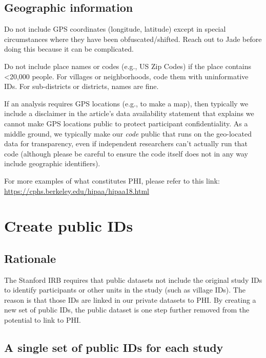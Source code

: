 \documentclass[
]{book}
\begin{document}
\subsection{Geographic information}\label{geographic-information}

Do not include GPS coordinates (longitude, latitude) except in special circumstances where they have been obfuscated/shifted. Reach out to Jade before doing this because it can be complicated.

Do not include place names or codes (e.g., US Zip Codes) if the place contains \textless20,000 people. For villages or neighborhoods, code them with uninformative IDs. For sub-districts or districts, names are fine.

If an analysis requires GPS locations (e.g., to make a map), then typically we include a disclaimer in the article's data availability statement that explains we cannot make GPS locations public to protect participant confidentiality. As a middle ground, we typically make our \emph{code} public that runs on the geo-located data for transparency, even if independent researchers can't actually run that code (although please be careful to ensure the code itself does not in any way include geographic identifiers).

For more examples of what constitutes PHI, please refer to this link: \url{https://cphs.berkeley.edu/hipaa/hipaa18.html}

\section{Create public IDs}\label{create-public-ids}

\subsection{Rationale}\label{rationale}

The Stanford IRB requires that public datasets not include the original study IDs to identify participants or other units in the study (such as village IDs). The reason is that those IDs are linked in our private datasets to PHI. By creating a new set of public IDs, the public dataset is one step further removed from the potential to link to PHI.

\subsection{A single set of public IDs for each study}\label{a-single-set-of-public-ids-for-each-study}
\end{document}
